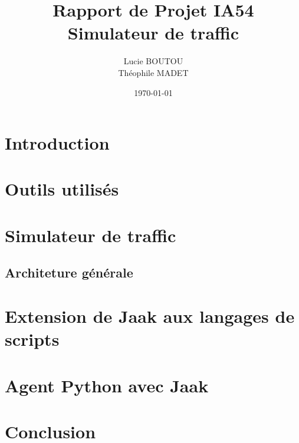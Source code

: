 \documentclass[a4paper,12pt]{report}
\title{Rapport de Projet IA54 \\ Simulateur de traffic}
\author{Lucie BOUTOU \\ Théophile MADET}
\date{\today}
\begin{document}
\setcounter{page}{2}
\tableofcontents

\newpage

\chapter{Introduction}



\chapter{Outils utilisés}

\chapter{Simulateur de traffic}

\section{Architeture générale}

\chapter{Extension de Jaak aux langages de scripts}

\chapter{Agent Python avec Jaak}

\chapter{Conclusion}
\end{document}
